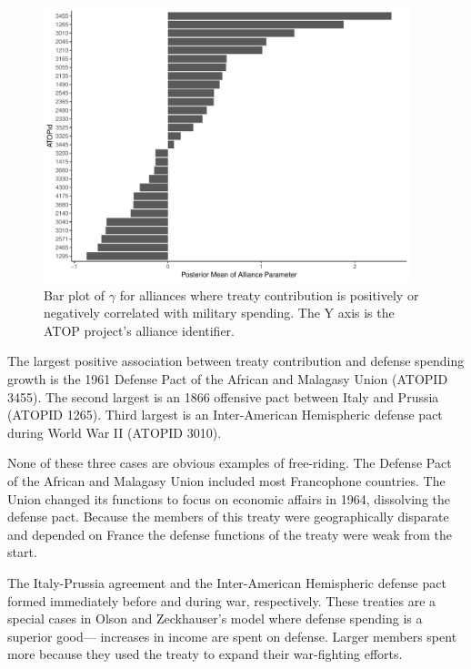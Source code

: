\documentclass[12pt]{article}
\begin{document}
\begin{figure}
	\centering
		\includegraphics[width=0.95\textwidth]{nonzero-alliance-coefs.pdf}
	\caption{Bar plot of $\gamma$ for alliances where treaty contribution is positively or negatively correlated with military spending. The Y axis is the ATOP project's alliance identifier.}	
	\label{fig:nonzero-alliance-coefs}
\end{figure}


The largest positive association between treaty contribution and defense spending growth is the 1961 Defense Pact of the African and Malagasy Union (ATOPID 3455). 
The second largest is an 1866 offensive pact between Italy and Prussia (ATOPID 1265). 
Third largest is an Inter-American Hemispheric defense pact during World War II (ATOPID 3010). 


None of these three cases are obvious examples of free-riding. 
The Defense Pact of the African and Malagasy Union included most Francophone countries. 
The Union changed its functions to focus on economic affairs in 1964, dissolving the defense pact. 
Because the members of this treaty were geographically disparate and depended on France the defense functions of the treaty were weak from the start. 


The Italy-Prussia agreement and the Inter-American Hemispheric defense pact formed immediately before and during war, respectively. 
These treaties are a special cases in Olson and Zeckhauser's model where defense spending is a superior good--- increases in income are spent on defense. 
Larger members spent more because they used the treaty to expand their war-fighting efforts. 
\end{document}
